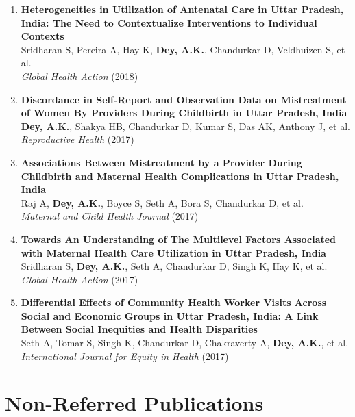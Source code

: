 \documentclass[13pt,letterpaper]{article}
\begin{document}
\begin{enumerate}
\item \textbf{Heterogeneities in Utilization of Antenatal Care in Uttar Pradesh, India: The Need to Contextualize Interventions to Individual Contexts}\\
Sridharan S, Pereira A, Hay K, \textbf{Dey, A.K.}, Chandurkar D, Veldhuizen S, et al.\\
\emph{Global Health Action} (2018) 

\item \textbf{Discordance in Self-Report and Observation Data on Mistreatment of Women By Providers During Childbirth in Uttar Pradesh, India}\\
\textbf{Dey, A.K.}, Shakya HB, Chandurkar D, Kumar S, Das AK, Anthony J, et al.\\
\emph{Reproductive Health} (2017) 

\item \textbf{Associations Between Mistreatment by a Provider During Childbirth and Maternal Health Complications in Uttar Pradesh, India}\\
Raj A, \textbf{Dey, A.K.}, Boyce S, Seth A, Bora S, Chandurkar D, et al.\\
\emph{Maternal and Child Health Journal} (2017) 

\item \textbf{Towards An Understanding of The Multilevel Factors Associated with Maternal Health Care Utilization in Uttar Pradesh, India}\\
Sridharan S, \textbf{Dey, A.K.}, Seth A, Chandurkar D, Singh K, Hay K, et al.\\
\emph{Global Health Action} (2017) 

\item \textbf{Differential Effects of Community Health Worker Visits Across Social and Economic Groups in Uttar Pradesh, India: A Link Between Social Inequities and Health Disparities}\\
Seth A, Tomar S, Singh K, Chandurkar D, Chakraverty A, \textbf{Dey, A.K.}, et al.\\
\emph{International Journal for Equity in Health} (2017) 
\end{enumerate}
\section*{Non-Referred Publications}
\label{sec:org7b6842c}
\end{document}
